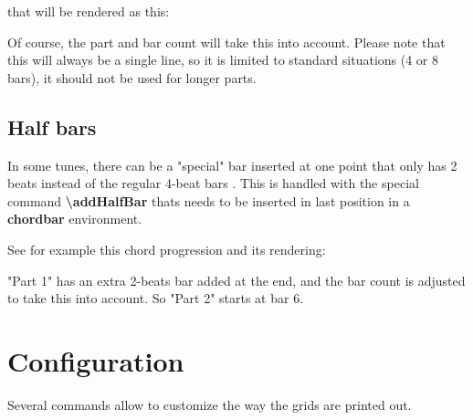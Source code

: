 \documentclass[11pt]{article}
\newcommand{\btt}{\bfseries \ttfamily }
\newcommand{\tbs}{\textbackslash{}}
\begin{document}
that will be rendered as this:


Of course, the part and bar count will take this into account.
Please note that this will always be a single line, so it is limited to standard situations (4 or 8 bars), it should not be used for longer parts.

\subsection{Half bars}

In some tunes, there can be a "special" bar inserted at one point that only has 2 beats instead of the regular 4-beat bars .
This is handled with the special command {\btt \tbs addHalfBar} thats needs to be inserted in last position in a {\btt chordbar} environment.

See for example this chord progression and its rendering:



\resetchordbars
\countbarsYes


"Part 1" has an extra 2-beats bar added at the end, and the bar count is adjusted to take this into account.
So "Part 2" starts at bar 6.

\section{Configuration}
\label{sec:config}

Several commands allow to customize the way the grids are printed out.
\end{document}
